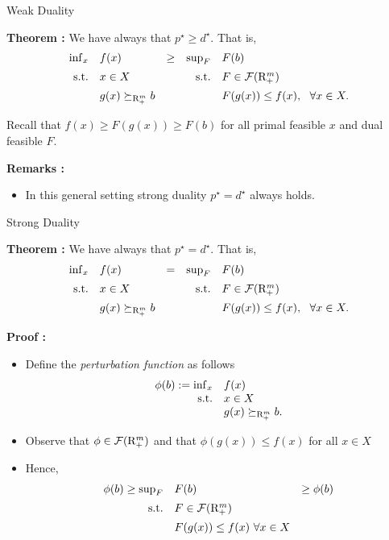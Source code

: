 \documentclass[9pt]{beamer}
\begin{document}
\begin{frame}{Weak Duality}

  \textbf{Theorem : } We have always that $p^\star \geq d^\star$. That is, 
  \[
    \begin{array}{rlcrl}
      \inf_x & f(x)  & \geq & \sup_F & F(b) \\[0.5em]
      \mathrm{s.t.} & x\in X   & &                       \mathrm{s.t.} & F \in \mathcal F(\mathrm{R}^m_+) \\[0.5em]
           & g(x) \succeq_{\mathrm{R}^m_+} b &&    & F(g(x)) \leq f(x), ~~\forall x \in X.
    \end{array}
  \]

  Recall that $f(x) \geq F(g(x)) \geq F(b)$ for all primal feasible $x$ and dual feasible $F$.


  \vfill
  \textbf{Remarks :}
  \begin{itemize}
  \item<2-> In this general setting strong duality $p^\star=d^\star$ always holds.
  \end{itemize}
  
\end{frame}

\begin{frame}{Strong Duality}

  \textbf{Theorem : } We have always that $p^\star = d^\star$. That is, 
  \[
    \begin{array}{rlcrl}
      \inf_x & f(x)  & = & \sup_F & F(b) \\[0.5em]
      \mathrm{s.t.} & x\in X   & &                       \mathrm{s.t.} & F \in \mathcal F(\mathrm{R}^m_+) \\[0.5em]
           & g(x) \succeq_{\mathrm{R}^m_+} b &&    & F(g(x)) \leq f(x), ~~\forall x \in X.
    \end{array}
  \]

  \vfill

  \textbf{Proof : }
  \begin{itemize}
  \item<2-> Define the \emph{perturbation function} as follows
    \[
      \begin{array}{rl}
        \phi(b) := \inf_x & f(x) \\
        \mathrm{s.t.} & x\in X\\
                             & g(x) \succeq_{\mathrm{R}^m_+} b.
      \end{array}
    \]
  \item<3-> Observe that $\phi \in \mathcal F(\mathrm{R}^m_+)$ and that $\phi(g(x))\leq f(x)$ for all $x\in X$
  \item<4-> Hence,
    \[
      \begin{array}{rll}
        \phi(b) \geq \sup_F & F(b) & \geq \phi(b) \\[0.5em]
        \mathrm{s.t.}     & F \in \mathcal F(\mathrm{R}^m_+) & \\[0.5em]
                            & F(g(x)) \leq f(x) ~\forall x \in X &
      \end{array}
    \]
  \end{itemize}

\end{frame}
\end{document}
